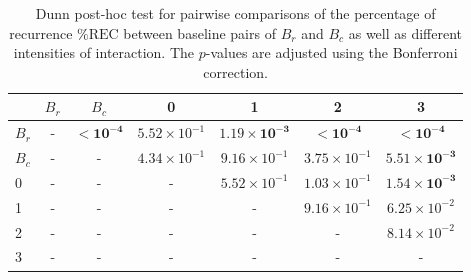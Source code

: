 \begin{table}
\centering
\caption{Dunn post-hoc test for pairwise comparisons of the percentage of recurrence $\%\text{REC}$ between baseline pairs of $B_r$ and $B_c$ as well as different intensities of interaction. The $p$-values are adjusted using the Bonferroni correction.}
\label{tab:dunn_rec}
\begin{tabular}{lcccccc}
\toprule
 & $B_r$ & $B_c$ & 0 & 1 & 2 & 3 \\
\midrule
$B_r$ & - & $\mathbf{< 10^{-4}}$ & $5.52 \times 10^{-1}$ & $\mathbf{1.19 \times 10^{-3}}$ & $\mathbf{< 10^{-4}}$ & $\mathbf{< 10^{-4}}$ \\
$B_c$ & - & - & $4.34 \times 10^{-1}$ & $9.16 \times 10^{-1}$ & $3.75 \times 10^{-1}$ & $\mathbf{5.51 \times 10^{-3}}$ \\
0 & - & - & - & $5.52 \times 10^{-1}$ & $1.03 \times 10^{-1}$ & $\mathbf{1.54 \times 10^{-3}}$ \\
1 & - & - & - & - & $9.16 \times 10^{-1}$ & $6.25 \times 10^{-2}$ \\
2 & - & - & - & - & - & $8.14 \times 10^{-2}$ \\
3 & - & - & - & - & - & - \\
\bottomrule
\end{tabular}
\end{table}
